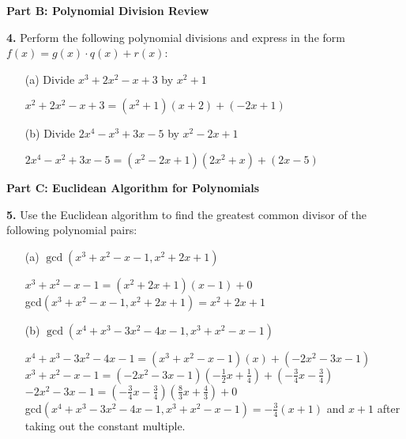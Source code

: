 \documentclass[12pt]{article}
\begin{document}
\newpage

\textbf{Part B: Polynomial Division Review}

\textbf{4.} Perform the following polynomial divisions and express in the form $f(x) = g(x) \cdot q(x) + r(x)$:

\begin{enumerate}
\item[(a)] Divide $x^3 + 2x^2 - x + 3$ by $x^2 + 1$
\\[8pt]
\begin{minipage}[t][4cm][t]{\linewidth}
    $\displaystyle x^2+2x^2-x+3 = (x^2+1)(x+2) + (-2x+1)$
\end{minipage}

\item[(b)] Divide $2x^4 - x^3 + 3x - 5$ by $x^2 - 2x + 1$
\\[8pt]
\begin{minipage}[t][4cm][t]{\linewidth}
    $\displaystyle 2x^4-x^2+3x-5 = (x^2-2x+1)(2x^2+x) + (2x-5)$
\end{minipage}
\end{enumerate}

\textbf{Part C: Euclidean Algorithm for Polynomials}

\textbf{5.} Use the Euclidean algorithm to find the greatest common divisor of the following polynomial pairs:

\begin{enumerate}
\item[(a)] $\gcd(x^3 + x^2 - x - 1, x^2 + 2x + 1)$
\\[8pt]
\begin{minipage}[t][8cm][t]{\linewidth}
    $\displaystyle x^3+x^2-x-1 = (x^2+2x+1)(x-1) + 0$
    \\[8pt] gcd$(x^3+x^2-x-1, x^2+2x+1) = x^2+2x+1$
\end{minipage}

\item[(b)] $\gcd(x^4 + x^3 - 3x^2 - 4x - 1, x^3 + x^2 - x - 1)$
\\[8pt]
\begin{minipage}[t][6cm][t]{\linewidth}
    $\displaystyle x^4+x^3-3x^2-4x-1 = (x^3+x^2-x-1)(x) + (-2x^2-3x-1)$
    \\[8pt] $x^3+x^2-x-1 = (-2x^2-3x-1)(-\frac{1}{2}x+\frac{1}{4}) + (-\frac{3}{4}x-\frac{3}{4})$
    \\[8pt] $-2x^2-3x-1 = (-\frac{3}{4}x-\frac{3}{4})(\frac{8}{3}x+\frac{4}{3}) + 0$
    \\[8pt] gcd$(x^4+x^3-3x^2-4x-1, x^3+x^2-x-1) = -\frac{3}{4}(x+1)$ and $x+1$ after taking out the constant multiple.
\end{minipage}
\end{enumerate}
\end{document}
